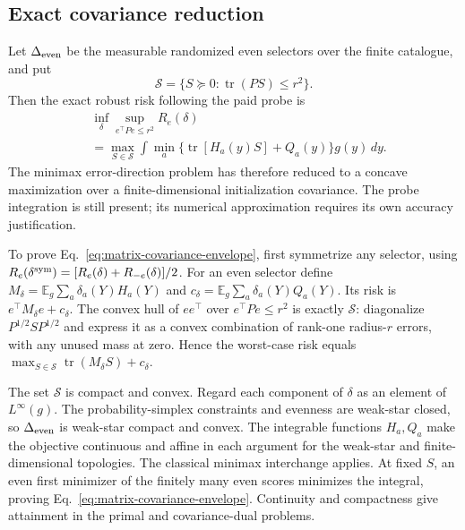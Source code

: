 \subsection{Exact covariance reduction}
Let $\Delta_{\rm even}$ be the measurable randomized even selectors over the finite catalogue, and put
\[
\mathcal S=\{S\succeq0:\operatorname{tr}(PS)\le r^2\}.
\]
Then the exact robust risk following the paid probe is
\begin{align}
&\inf_{\delta}\sup_{e^\top Pe\le r^2}R_e(\delta)\nonumber\\
&=\max_{S\in\mathcal S}\int\min_a\{\operatorname{tr}[H_a(y)S]+Q_a(y)\}g(y)\,dy.
\label{eq:matrix-covariance-envelope}
\end{align}
The minimax error-direction problem has therefore reduced to a concave maximization over a finite-dimensional initialization covariance.
The probe integration is still present; its numerical approximation requires its own accuracy justification.

To prove Eq.~\eqref{eq:matrix-covariance-envelope}, first symmetrize any selector, using $R_e(\delta^{\rm sym})=[R_e(\delta)+R_{-e}(\delta)]/2$.
For an even selector define $M_\delta=\mathbb E_g\sum_a\delta_a(Y)H_a(Y)$ and $c_\delta=\mathbb E_g\sum_a\delta_a(Y)Q_a(Y)$.
Its risk is $e^\top M_\delta e+c_\delta$.
The convex hull of $ee^\top$ over $e^\top Pe\le r^2$ is exactly $\mathcal S$: diagonalize $P^{1/2}SP^{1/2}$ and express it as a convex combination of rank-one radius-$r$ errors, with any unused mass at zero.
Hence the worst-case risk equals $\max_{S\in\mathcal S}\operatorname{tr}(M_\delta S)+c_\delta$.

The set $\mathcal S$ is compact and convex.
Regard each component of $\delta$ as an element of $L^\infty(g)$.
The probability-simplex constraints and evenness are weak-star closed, so $\Delta_{\rm even}$ is weak-star compact and convex.
The integrable functions $H_a,Q_a$ make the objective continuous and affine in each argument for the weak-star and finite-dimensional topologies.
The classical minimax interchange applies.
At fixed $S$, an even first minimizer of the finitely many even scores minimizes the integral, proving Eq.~\eqref{eq:matrix-covariance-envelope}.
Continuity and compactness give attainment in the primal and covariance-dual problems.

